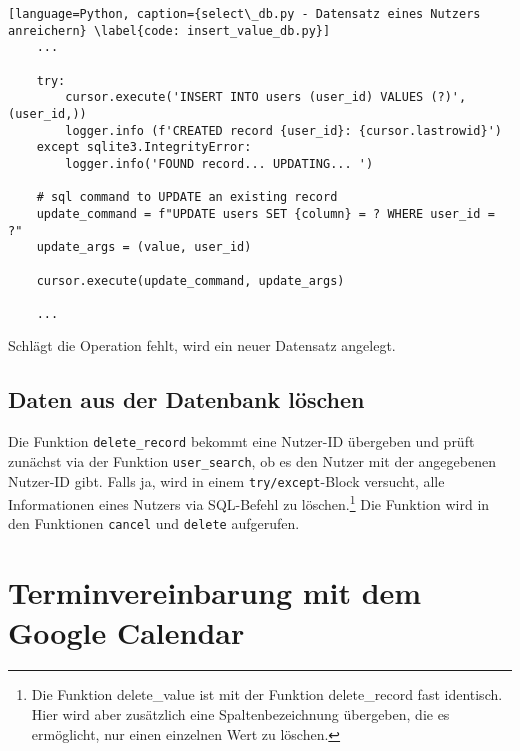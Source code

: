             \begin{lstlisting}[language=Python, caption={select\_db.py - Datensatz eines Nutzers anreichern} \label{code: insert_value_db.py}]
    ...

    try:
        cursor.execute('INSERT INTO users (user_id) VALUES (?)', (user_id,))
        logger.info (f'CREATED record {user_id}: {cursor.lastrowid}')
    except sqlite3.IntegrityError:
        logger.info('FOUND record... UPDATING... ')

    # sql command to UPDATE an existing record
    update_command = f"UPDATE users SET {column} = ? WHERE user_id = ?"
    update_args = (value, user_id)

    cursor.execute(update_command, update_args)

    ...

            \end{lstlisting}

            Schlägt die Operation fehlt, wird ein neuer Datensatz angelegt.
        
        \subsection{Daten aus der Datenbank löschen} \label{Implementierung: delete_record.py}
            Die Funktion \verb|delete_record| bekommt eine Nutzer-ID übergeben und prüft zunächst via der Funktion \verb|user_search|, ob es den Nutzer mit der angegebenen Nutzer-ID gibt. Falls ja, wird in einem \verb|try/except|-Block versucht, alle Informationen eines Nutzers via SQL-Befehl zu löschen.\footnote{Die Funktion delete\_value ist mit der Funktion delete\_record fast identisch. Hier wird aber zusätzlich eine Spaltenbezeichnung übergeben, die es ermöglicht, nur einen einzelnen Wert zu löschen.} Die Funktion wird in den Funktionen \verb|cancel| und \verb|delete| aufgerufen.











    \section{Terminvereinbarung mit dem Google Calendar} \label{Implementierung: Kalender} 
        
